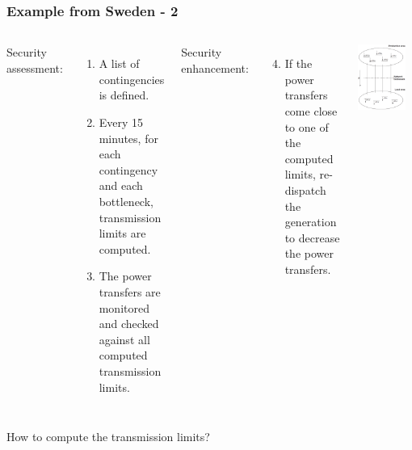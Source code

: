 \documentclass{beamer}
\begin{document}
\begin{frame}
\frametitle{Example from Sweden - 2}
\begin{columns}
Security assessment:
\begin{enumerate}
\item A list of contingencies is defined.
\item Every 15 minutes, for each contingency and each bottleneck, transmission limits are computed.
\item The power transfers are monitored and checked against all computed transmission limits.
\end{enumerate}
Security enhancement:
\begin{enumerate}
\setcounter{enumi}{3}
\item If the power transfers come close to one of the computed limits, re-dispatch the generation to decrease the power transfers.
\end{enumerate}
\begin{center}
\includegraphics[width=0.85\textwidth]{Figs/SPICAjob}
\end{center}
\end{columns}
\begin{block}{}
How to compute the transmission limits?
\end{block}
\end{frame}
\end{document}
